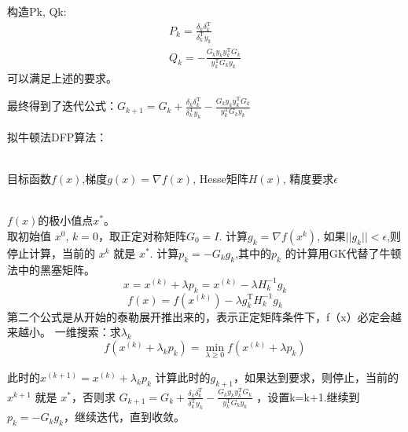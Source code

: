 \documentclass[UTF8]{ctexart}
\begin{document}
构造Pk, Qk:
$$\begin{array}{c}
P_{k}=\frac{\delta_{k} \delta_{k}^{\mathrm{T}}}{\delta_{k}^{\mathrm{T}} y_{k}} \\
Q_{k}=-\frac{G_{k} y_{k} y_{k}^{\mathrm{T}} G_{k}}{y_{k}^{\mathrm{T}} G_{k} y_{k}}
\end{array}$$
可以满足上述的要求。

最终得到了迭代公式：$G_{k+1}=G_{k}+\frac{\delta_{k} \delta_{k}^{\mathrm{T}}}{\delta_{k}^{\mathrm{T}} y_{k}}-\frac{G_{k} y_{k} y_{k}^{\mathrm{T}} G_{k}}{y_{k}^{\mathrm{T}} G_{k} y_{k}}$

\begin{algorithm}[h] 
	\caption{ 拟牛顿法DFP算法：} 
	\label{alg:Framwork2} 
	\begin{algorithmic}[1] %
		\REQUIRE ~~\\ %
		目标函数$f(x)$,梯度$g(x)=\nabla f(x)$, Hesse矩阵$H(x)$, 精度要求$\epsilon$
		
		\ENSURE ~~\\ %
		$f(x)$的极小值点$x^*$。\\
		\STATE 取初始值 $x^0$, $k=0$，取正定对称矩阵$G_0 = I$.
		\STATE 计算$g_{k} = \nabla f(x^{k})$, 如果$||g_{k}|| < \epsilon $,则停止计算，当前的 $x^{k}$ 就是 $x^{*}$.
		\STATE 计算$p_k = -G_k g_k$,其中的$p_k$ 的计算用GK代替了牛顿法中的黑塞矩阵。
		$$
		x=x^{(k)}+\lambda p_{k}=x^{(k)}-\lambda H_{k}^{-1} g_{k}
		$$ $$
		f(x)=f\left(x^{(k)}\right)-\lambda g_{k}^{\mathrm{T}} H_{k}^{-1} g_{k}
		$$
		第二个公式是从开始的泰勒展开推出来的，表示正定矩阵条件下，f（x）必定会越来越小。
		\STATE 一维搜索：求$\lambda_k$ 
		$$
		f\left(x^{(k)}+\lambda_{k} p_{k}\right)=\min _{\lambda \geqslant 0} f\left(x^{(k)}+\lambda p_{k}\right)
		$$
		
		此时的$x^{(k+1)} = x^{(k)} + \lambda_k p_{k}$
		\STATE 计算此时的$g_{k+1}$，如果达到要求，则停止，当前的 $x^{k+1}$ 就是 $x^{*}$，否则求
		$G_{k+1}=G_{k}+\frac{\delta_{k} \delta_{k}^{\mathrm{T}}}{\delta_{k}^{\mathrm{T}} y_{k}}-\frac{G_{k} y_{k} y_{k}^{\mathrm{T}} G_{k}}{y_{k}^{\mathrm{T}} G_{k} y_{k}}$
		，设置k=k+1.继续到$p_k = -G_k g_k$，继续迭代，直到收敛。
		
	
		
		
	\end{algorithmic}
\end{algorithm}
\end{document}
